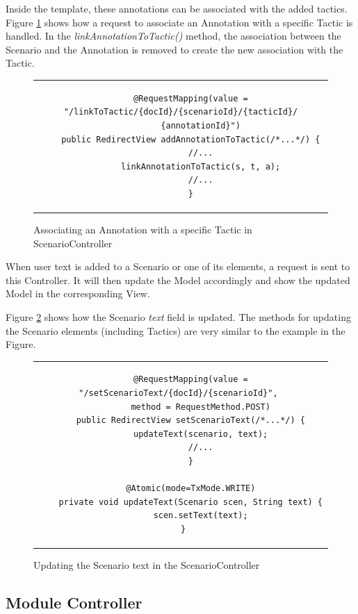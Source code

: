 Inside the template, these annotations can be associated with the added tactics. Figure \ref{figure:scenarioControllerLinkToTactic} shows how a request to associate an Annotation with a specific Tactic is handled. In the \textit{linkAnnotationToTactic()} method, the association between the Scenario and the Annotation is removed to create the new association with the Tactic.

\begin{figure}[h]
\centering
\lstset{style=customjava}
\begin{tabular}{c}
\begin{lstlisting}
	@RequestMapping(value = "/linkToTactic/{docId}/{scenarioId}/{tacticId}/
		{annotationId}")
	public RedirectView addAnnotationToTactic(/*...*/) {
		//...
		linkAnnotationToTactic(s, t, a);
		//...
	}
\end{lstlisting}
\end{tabular}
\caption{Associating an Annotation with a specific Tactic in ScenarioController}
\label{figure:scenarioControllerLinkToTactic}
\end{figure}

When user text is added to a Scenario or one of its elements, a request is sent to this Controller. It will then update the Model accordingly and show the updated Model in the corresponding View.

Figure \ref{figure:scenarioControllerText} shows how the Scenario \textit{text} field is updated. The methods for updating the Scenario elements (including Tactics) are very similar to the example in the Figure.

\begin{figure}[h]
\centering
\lstset{style=customjava}
\begin{tabular}{c}
\begin{lstlisting}
	@RequestMapping(value = "/setScenarioText/{docId}/{scenarioId}", 
		method = RequestMethod.POST)
	public RedirectView setScenarioText(/*...*/) {
		updateText(scenario, text);
		//...
	}
	
	@Atomic(mode=TxMode.WRITE)
	private void updateText(Scenario scen, String text) {
		scen.setText(text);
	}	
\end{lstlisting}
\end{tabular}
\caption{Updating the Scenario text in the ScenarioController}
\label{figure:scenarioControllerText}
\end{figure}

\subsection{Module Controller}

